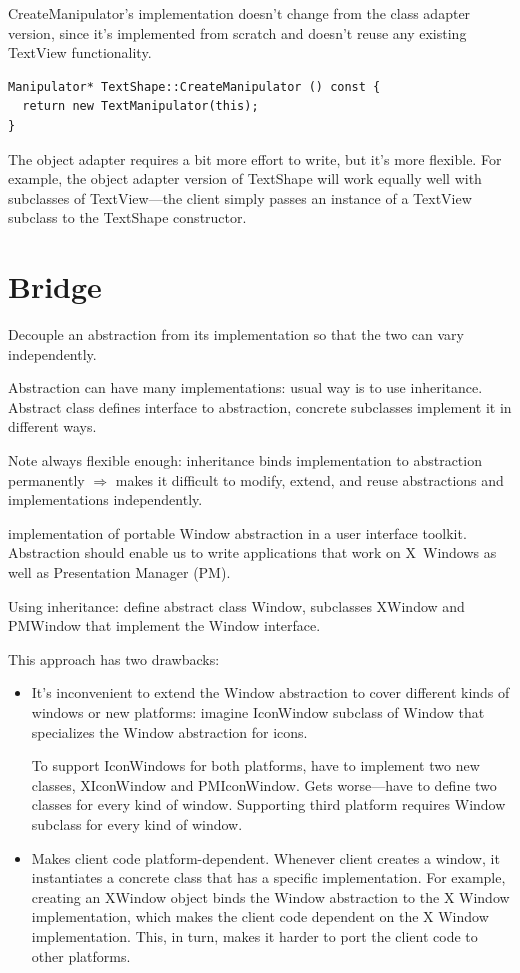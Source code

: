 \documentclass[11pt]{report}
\begin{document}
CreateManipulator's implementation doesn't change from the class adapter version, since 
it's implemented from scratch and doesn't reuse any existing TextView functionality.
\begin{lstlisting}
Manipulator* TextShape::CreateManipulator () const {
  return new TextManipulator(this);
}
\end{lstlisting}

The object adapter requires a bit more effort to write, 
but it's more flexible. For example, the object adapter version of 
TextShape will work equally well with subclasses of TextView---the client simply 
passes an instance of a TextView subclass to the TextShape constructor.

\section{Bridge}

 Decouple an abstraction from its implementation so that the two can vary independently.

Abstraction can have many implementations: usual way is to use 
inheritance. Abstract class defines interface to abstraction, concrete subclasses 
implement it in different ways. 

Note always flexible enough: inheritance binds implementation to 
abstraction permanently $\Rightarrow$ makes it difficult to modify, 
extend, and reuse abstractions and implementations 
independently.

 implementation of portable Window abstraction in 
a user interface toolkit. Abstraction should 
enable us to write applications that work on X~Windows as well as Presentation Manager (PM). 

Using inheritance: define abstract class Window, subclasses XWindow and PMWindow that 
implement the Window interface. 

This approach has two drawbacks:

\begin{itemize}

\item It's inconvenient to extend the Window abstraction to cover different kinds of 
windows or new platforms: imagine IconWindow subclass of Window that 
specializes the Window abstraction for icons. 

To support IconWindows for both 
platforms, have to implement two new classes, XIconWindow and PMIconWindow. Gets worse---have to define two 
classes for every kind of window. Supporting third platform requires Window subclass for every kind of window.

\item Makes client code platform-dependent. Whenever client creates a window, it instantiates a concrete class 
that has a specific implementation. For example, creating an XWindow object binds the Window abstraction to the X 
Window implementation, which makes the client code dependent on the X Window implementation. This, in turn, makes it 
harder to port the client code to other platforms.

\end{itemize}
\end{document}

